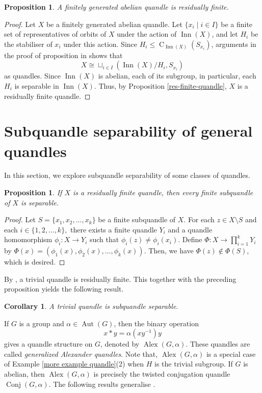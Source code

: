 \documentclass[12pt]{amsart}
\newtheorem{corollary}[theorem]{Corollary}
\newtheorem{prop}[theorem]{Proposition}
\theoremstyle{definition}
\numberwithin{equation}{subsection}
\newcommand{\Alex}{\operatorname{Alex}}
\newcommand{\Aut}{\operatorname{Aut}}
\newcommand{\Conj}{\operatorname{Conj}}
\newcommand{\C}{\operatorname{C}}
\newcommand{\Inn}{\operatorname{Inn}}
\begin{document}
\begin{prop}\label{X is rf for abelian}
A finitely generated abelian quandle is residually finite.
\end{prop}
\begin{proof}
Let $X$ be a finitely generated abelian quandle. Let $\{x_i \mid i \in I\}$ be a finite set of representatives of orbits of $X$ under the action of $\Inn(X)$, and let $H_i$ be the stabiliser of $x_i$ under this action. Since $H_i \le \C_{\Inn(X)}(S_{x_i})$, arguments in the proof of proposition in \cite[Section 2.4]{Joyce1979} shows that  $$X \cong \sqcup_{i \in I} (\Inn(X)/H_i,S_{x_i})$$ as quandles. Since $\Inn(X)$ is abelian, each of its subgroup, in particular, each $H_i$ is separable in $\Inn(X)$. Thus, by Proposition \ref{res-finite-quandle}, $X$ is a residually finite quandle.
\end{proof}
\medskip


\section{Subquandle separability of general quandles}
In this section, we explore subquandle separability of some classes of quandles.

\begin{prop}\label{finite-sub-separable}
If $X$ is a residually finite quandle, then every finite subquandle of $X$ is separable.
\end{prop}
\begin{proof}
Let $S=\{x_1, x_2, \ldots, x_k\}$ be a finite subquandle of $X$. For each $z \in X \setminus S$ and each $i \in \{1,2, \ldots, k\},$ there exists a finite quandle $Y_i$ and a quandle homomorphism $\phi_i:X \rightarrow Y_i$ such that $\phi_i(z) \neq \phi_i(x_i)$. Define $\Phi:X \rightarrow \prod_{i=1}^k Y_i$ by $\Phi(x)= (\phi_1(x), \phi_2(x), \ldots, \phi_k(x))$. Then, we have $\Phi(z) \notin \Phi(S)$, which is desired.
\end{proof}

By \cite[Proposition 3.2]{MR3981139}, a trivial quandle is residually finite. This together with the preceding proposition yields the following result.

\begin{corollary}
A trivial quandle is subquandle separable.
\end{corollary}


If $G$ is a group and $\alpha \in \Aut(G)$, then the  binary operation $$x*y=\alpha(xy^{-1})y$$ gives a quandle structure on $G$, denoted by $\Alex(G, \alpha)$. These quandles are called  {\it generalized Alexander quandles}. Note that, $\Alex(G, \alpha)$ is a special case of Example \ref{more example quandle}(2) when $H$ is the trivial subgroup. If $G$ is abelian, then $\Alex(G,\alpha)$ is precisely the twisted conjugation quandle $\Conj(G,\alpha)$. The following results generalise \cite[Proposition 4.1 and Proposition 4.2]{MR3981139}.
\end{document}
